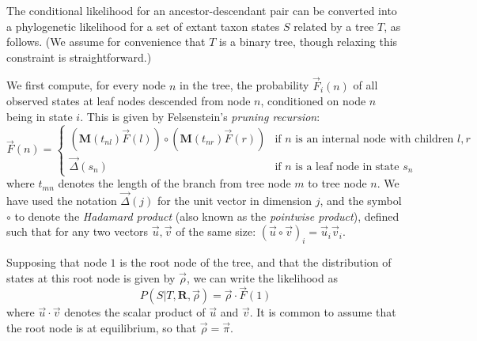 \documentclass{bmcart}
\newcommand{\matr}[1]{\mathbf{#1}}
\newcommand{\ratematrix}{\matr{R}}
\newcommand{\eqmvec}{\vec{\pi}}
\newcommand{\condmatrix}{\matr{M}}
\newcommand{\felsvec}{\vec{F}}
\newcommand{\unitvec}{\vec{\Delta}}
\newcommand{\pointprod}{\circ}
\newcommand{\scalarprod}{\cdot}
\newcommand{\initvec}{\vec{\rho}}
\begin{document}
The conditional likelihood for an ancestor-descendant pair can be converted
into a phylogenetic likelihood for a set of extant taxon states $S$ related by a tree $T$,
as follows.
(We assume for convenience that $T$ is a binary tree, though relaxing this constraint is straightforward.)

We first compute, for every node $n$ in the tree,
the probability $\felsvec_i(n)$
of all observed states at leaf nodes descended from node $n$,
conditioned on node $n$ being in state $i$.
This is given by Felsenstein's {\em pruning recursion}:
\begin{equation}
\felsvec(n) = \left\{
\begin{array}{ll}
\displaystyle
\left( \condmatrix(t_{nl}) \felsvec(l) \right)
\pointprod
\left( \condmatrix(t_{nr}) \felsvec(r) \right)
& \mbox{if $n$ is an internal node with children $l,r$} \\
\displaystyle
\vec{\Delta}(s_n)
& \mbox{if $n$ is a leaf node in state $s_n$}
\end{array}
\right.
\label{Felsenstein}
\end{equation}
where $t_{mn}$ denotes the length of the branch from tree node $m$ to tree node $n$.
We have used the notation
$\unitvec(j)$ for the unit vector in dimension $j$,
and the symbol
$\pointprod$ to denote the {\em Hadamard product} (also known as the {\em pointwise product}),
defined such that for any two vectors $\vec{u},\vec{v}$ of the same size:
$(\vec{u} \pointprod \vec{v})_i = \vec{u}_i \vec{v}_i$.

Supposing that node $1$ is the root node of the tree,
and that the distribution of states at this root node is given by $\initvec$,
we can write the likelihood as
\begin{equation}
P(S|T,\ratematrix,\initvec) = \initvec \scalarprod \felsvec(1)
\label{Likelihood}
\end{equation}
where $\vec{u} \scalarprod \vec{v}$ denotes the scalar product of $\vec{u}$ and $\vec{v}$.
It is common to assume that the root node is at equilibrium,
so that $\initvec = \eqmvec$.
\end{document}
